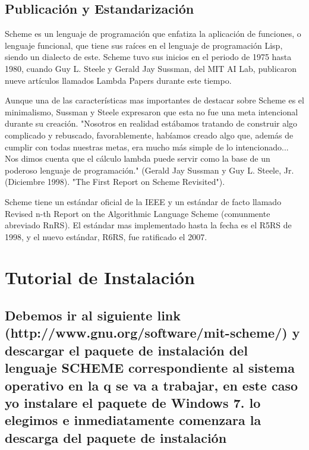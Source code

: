 \documentclass[11pt]{article} %
\begin{document}
\subsection{Publicación y Estandarización}

Scheme es un lenguaje de programación que enfatiza la aplicación de funciones, o lenguaje funcional, que tiene sus raíces en el lenguaje de programación Lisp, siendo un dialecto de este. Scheme tuvo sus inicios en el periodo de 1975 hasta 1980, cuando Guy L. Steele y Gerald Jay Sussman, del MIT AI Lab, publicaron nueve artículos llamados Lambda Papers durante este tiempo.

Aunque una de las características mas importantes de destacar sobre Scheme es el minimalismo, Sussman y Steele expresaron que esta no fue una meta intencional durante su creación. "Nosotros en realidad estábamos tratando de construir algo complicado y rebuscado, favorablemente, habíamos creado algo que, además de cumplir con todas nuestras metas, era mucho más simple de lo intencionado... Nos dimos cuenta que el cálculo lambda puede servir como la base de un poderoso lenguaje de programación." (Gerald Jay Sussman y Guy L. Steele, Jr. (Diciembre 1998). "The First Report on Scheme Revisited").

Scheme tiene un estándar oficial de la IEEE y un estándar de facto llamado Revised n-th Report on the Algorithmic Language Scheme (comunmente abreviado RnRS). El estándar mas implementado hasta la fecha es el R5RS de 1998, y el nuevo estándar, R6RS, fue ratificado el 2007.
\section{Tutorial de Instalación}
\subsection{Debemos ir al siguiente link (http://www.gnu.org/software/mit-scheme/) y descargar el paquete de instalación del lenguaje SCHEME correspondiente al sistema operativo en la q se va a trabajar, en este caso yo instalare el paquete de Windows 7.
lo elegimos e inmediatamente comenzara la descarga del paquete de instalación}
\end{document}
